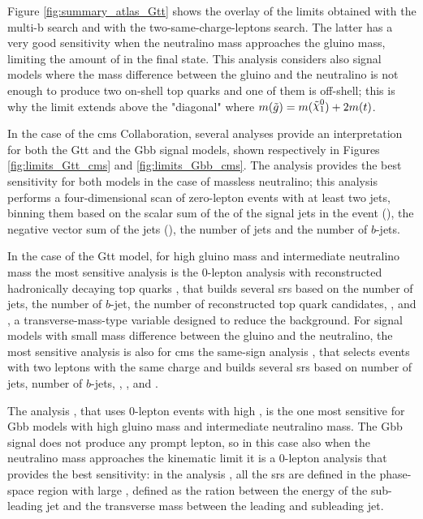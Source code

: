 Figure \ref{fig:summary_atlas_Gtt} shows the overlay of the limits obtained with the multi-b search and with the two-same-charge-leptons search.
The latter has a very good sensitivity when the neutralino mass approaches the gluino mass,
limiting the amount of \met in the final state.
This analysis considers also signal models where the mass difference between the gluino and the neutralino 
is not enough to produce two on-shell top quarks and one of them is off-shell; this is why the limit extends above 
the "diagonal" where $m(\tilde{g}) = m(\ninoone) + 2 m(t)$.


In the case of the \gls{cms} Collaboration, several analyses provide an interpretation for both the Gtt and 
the Gbb signal models, shown respectively in Figures \ref{fig:limits_Gtt_cms} and \ref{fig:limits_Gbb_cms}.
The \htmiss analysis \cite{Sirunyan:2017cwe} provides the best sensitivity for both models in the case of massless 
neutralino; this analysis performs a four-dimensional scan of zero-lepton events with at least two jets, binning them 
based on the scalar sum of the \pt of the signal jets in the event (\Ht), the negative vector sum of the jets (\htmiss), 
the number of jets and the number of $b$-jets. 

In the case of the Gtt model, for high gluino mass and intermediate neutralino mass the most sensitive analysis is
the 0-lepton analysis with reconstructed hadronically decaying top quarks \cite{Sirunyan:2017pjw}, 
that builds several \glspl{sr} based on the number of jets, the number of $b$-jet, the number of reconstructed top quark 
candidates, \met, \Ht and \mttwo, a transverse-mass-type variable designed to reduce the \ttbar background. 
For signal models with small mass difference between the gluino and the neutralino, the most sensitive analysis 
is also for \gls{cms} the same-sign analysis \cite{Sirunyan:2017uyt}, that selects events with two leptons with 
the same charge and builds several \glspl{sr} based on number of jets, number of $b$-jets, \met, \Ht, and \mt. 

The \mttwo analysis \cite{Sirunyan:2017kqq}, that uses 0-lepton events with high \mttwo,
 is the one most sensitive for Gbb models with high gluino mass 
and intermediate neutralino mass. 
The Gbb signal does not produce any prompt lepton, so in this case also when the neutralino mass approaches the kinematic 
limit it is a 0-lepton analysis that provides the best sensitivity: 
in the \alphat analysis \cite{Sirunyan:2018vjp}, all the \glspl{sr} are defined in the phase-space region 
with large \alphat, defined as the ration between the energy of the sub-leading jet and the transverse mass
between the leading and subleading jet. 

